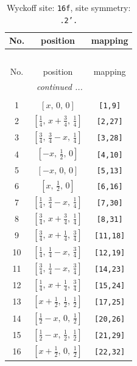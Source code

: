 \documentclass[fleqn,8pt]{jsarticle}
\begin{document}
\begin{longtable}{ccc}
\caption{Wyckoff site: {\tt 16f}, site symmetry: {\tt .2'.}}
 \\
 \hline \hline
No. & position & mapping \\ \hline \endfirsthead

\multicolumn{2}{l}{\tablename\ \thetable{}} \\
 \hline \hline
No. & position & mapping \\ \hline \endhead

 \hline \hline
\multicolumn{2}{r}{\footnotesize\it continued ...} \\ \endfoot

 \hline \hline
\multicolumn{2}{r}{} \\ \endlastfoot

1 & $\left[ x,\, 0,\, 0 \right]$ & {\tt [1,9]} \\ \hline
2 & $\left[ \frac{1}{4},\, x + \frac{3}{4},\, \frac{1}{4} \right]$ & {\tt [2,27]} \\ \hline
3 & $\left[ \frac{3}{4},\, \frac{3}{4} - x,\, \frac{1}{4} \right]$ & {\tt [3,28]} \\ \hline
4 & $\left[ - x,\, \frac{1}{2},\, 0 \right]$ & {\tt [4,10]} \\ \hline
5 & $\left[ - x,\, 0,\, 0 \right]$ & {\tt [5,13]} \\ \hline
6 & $\left[ x,\, \frac{1}{2},\, 0 \right]$ & {\tt [6,16]} \\ \hline
7 & $\left[ \frac{1}{4},\, \frac{3}{4} - x,\, \frac{1}{4} \right]$ & {\tt [7,30]} \\ \hline
8 & $\left[ \frac{3}{4},\, x + \frac{3}{4},\, \frac{1}{4} \right]$ & {\tt [8,31]} \\ \hline
9 & $\left[ \frac{3}{4},\, x + \frac{1}{4},\, \frac{3}{4} \right]$ & {\tt [11,18]} \\ \hline
10 & $\left[ \frac{1}{4},\, \frac{1}{4} - x,\, \frac{3}{4} \right]$ & {\tt [12,19]} \\ \hline
11 & $\left[ \frac{3}{4},\, \frac{1}{4} - x,\, \frac{3}{4} \right]$ & {\tt [14,23]} \\ \hline
12 & $\left[ \frac{1}{4},\, x + \frac{1}{4},\, \frac{3}{4} \right]$ & {\tt [15,24]} \\ \hline
13 & $\left[ x + \frac{1}{2},\, \frac{1}{2},\, \frac{1}{2} \right]$ & {\tt [17,25]} \\ \hline
14 & $\left[ \frac{1}{2} - x,\, 0,\, \frac{1}{2} \right]$ & {\tt [20,26]} \\ \hline
15 & $\left[ \frac{1}{2} - x,\, \frac{1}{2},\, \frac{1}{2} \right]$ & {\tt [21,29]} \\ \hline
16 & $\left[ x + \frac{1}{2},\, 0,\, \frac{1}{2} \right]$ & {\tt [22,32]} \\
\end{longtable}
\end{document}
